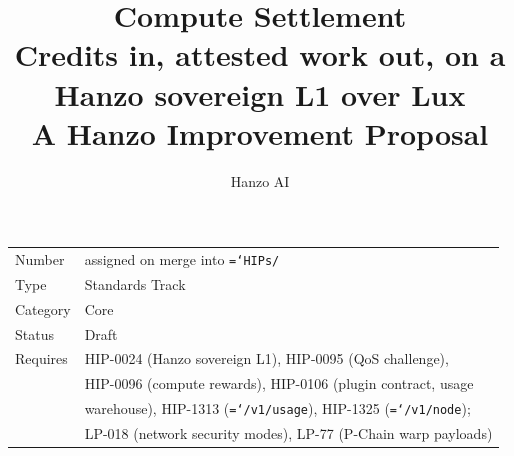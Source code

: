 \documentclass[11pt,a4paper]{article}
\title{\textbf{Compute Settlement}\\[4pt]
\large Credits in, attested work out, on a Hanzo sovereign L1 over Lux\\[6pt]
\large A Hanzo Improvement Proposal}
\author{Hanzo AI}
\date{}
\newcommand{\code}[1]{\texttt{\hyphenchar\font=`\-\relax #1}}
\begin{document}
\maketitle

\begin{center}
\begin{tabular}{@{}ll@{}}
\toprule
Number      & assigned on merge into \code{HIPs/} \\
Type        & Standards Track \\
Category    & Core \\
Status      & Draft \\
Requires    & HIP-0024 (Hanzo sovereign L1), HIP-0095 (QoS challenge),\\
            & HIP-0096 (compute rewards), HIP-0106 (plugin contract, usage\\
            & warehouse), HIP-1313 (\code{/v1/usage}), HIP-1325 (\code{/v1/node});\\
            & LP-018 (network security modes), LP-77 (P-Chain warp payloads) \\
\bottomrule
\end{tabular}
\end{center}
\end{document}
